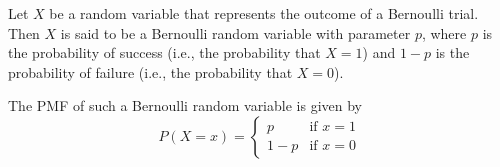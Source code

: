 \documentclass{article}
\begin{document}
Let \( X \) be a random variable that represents the outcome of a Bernoulli trial. Then \( X \) is said to be a Bernoulli random variable with parameter \( p \), where \( p \) is the probability of success (i.e., the probability that \( X = 1 \)) and \( 1 - p \) is the probability of failure (i.e., the probability that \( X = 0 \)). 

The PMF of such a Bernoulli random variable is given by
\[
P(X = x) = 
\begin{cases} 
p & \text{if } x = 1 \\
1 - p & \text{if } x = 0 
\end{cases}
\]
\end{document}
